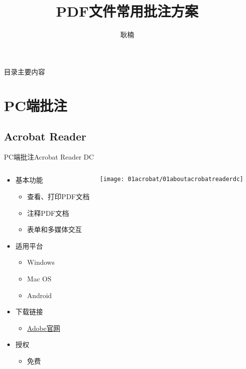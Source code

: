 \documentclass[fontset = none, t, aspectratio=169]{ctexbeamer}
\title[pdfReview]{\Large PDF文件常用批注方案}
\author[Nine, G.]{ 耿楠 }
\date{\tosemester}
\institute[%
CS, CIE\\
NWSUAF\\
Yangling, China ] %
{%
  \cs \\
  \cie

}
\begin{document}
\begin{frame} %
  \titlepage
\end{frame}


\begin{frame}{目录}{主要内容}
  \begin{multicols}{2}
    \tableofcontents
  \end{multicols}  
\end{frame}
%

\section{PC端批注}
\subsection{Acrobat Reader}
\begin{frame}{PC端批注}{Acrobat Reader DC}
  \begin{columns}[c,onlytextwidth]
    \begin{spacing}{1.2}
    \begin{itemize}
    \item 基本功能
      \begin{itemize}
      \item 查看、打印PDF文档
      \item \alert{注释}PDF文档
      \item 表单和多媒体交互
      \end{itemize}
    \item 适用平台
      \begin{itemize}
      \item Windows
      \item Mac OS
      \item Android
      \end{itemize}
    \item 下载链接
      \begin{itemize}
        \item \href{https://get.adobe.com/cn/reader/otherversions/}{Adobe官网}
      \end{itemize}
    \item 授权
      \begin{itemize}
      \item \alert{免费}
      \end{itemize}
    \end{itemize}
    \end{spacing}
    \texttt{[image: 01acrobat/01aboutacrobatreaderdc]}
  \end{columns}
\end{frame}
\end{document}
